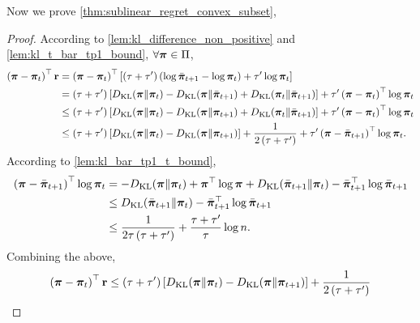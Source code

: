 Now we prove \cref{thm:sublinear_regret_convex_subset},
\begin{proof}
According to \cref{lem:kl_difference_non_positive} and \cref{lem:kl_t_bar_tp1_bound}, $\forall {\boldsymbol{\pi}} \in \Pi$,
\begin{equation*}
\begin{split}
    \left( {\boldsymbol{\pi}} - {\boldsymbol{\pi}}_t \right)^\top {\mathbf{r}} &= \left( {\boldsymbol{\pi}} - {\boldsymbol{\pi}}_t \right)^\top \left[ \left(\tau + \tau^\prime\right) \left( \log{\bar{{\boldsymbol{\pi}}}_{t+1}} - \log{{\boldsymbol{\pi}}_t} \right) + \tau^\prime \log{{\boldsymbol{\pi}}_t} \right] \\
    &= \left(\tau + \tau^\prime\right) \left[ D_{\mathrm{KL}}{\left( {\boldsymbol{\pi}} \middle\| {\boldsymbol{\pi}}_t \right)} - D_{\mathrm{KL}}{\left( {\boldsymbol{\pi}} \middle\| \bar{{\boldsymbol{\pi}}}_{t+1} \right)} + D_{\mathrm{KL}}{\left( {\boldsymbol{\pi}}_t \middle\| \bar{{\boldsymbol{\pi}}}_{t+1} \right)}  \right] + \tau^\prime \left( {\boldsymbol{\pi}} - {\boldsymbol{\pi}}_t \right)^\top \log{{\boldsymbol{\pi}}_t} \\
    &\le \left(\tau + \tau^\prime\right) \left[ D_{\mathrm{KL}}{\left( {\boldsymbol{\pi}} \middle\| {\boldsymbol{\pi}}_t \right)} - D_{\mathrm{KL}}{\left( {\boldsymbol{\pi}} \middle\| {\boldsymbol{\pi}}_{t+1} \right)} + D_{\mathrm{KL}}{\left( {\boldsymbol{\pi}}_t \middle\| \bar{{\boldsymbol{\pi}}}_{t+1} \right)}  \right] + \tau^\prime \left( {\boldsymbol{\pi}} - {\boldsymbol{\pi}}_t \right)^\top \log{{\boldsymbol{\pi}}_t} \\
    &\le \left(\tau + \tau^\prime\right) \left[ D_{\mathrm{KL}}{\left( {\boldsymbol{\pi}} \middle\| {\boldsymbol{\pi}}_t \right)} - D_{\mathrm{KL}}{\left( {\boldsymbol{\pi}} \middle\| {\boldsymbol{\pi}}_{t+1} \right)} \right] + \frac{1}{2\left(\tau + \tau^\prime\right)} + \tau^\prime \left( {\boldsymbol{\pi}} - \bar{{\boldsymbol{\pi}}}_{t+1} \right)^\top \log{{\boldsymbol{\pi}}_t}.
\end{split}
\end{equation*}
According to \cref{lem:kl_bar_tp1_t_bound},
\begin{equation*}
\begin{split}
    \left( {\boldsymbol{\pi}} - \bar{{\boldsymbol{\pi}}}_{t+1} \right)^\top \log{{\boldsymbol{\pi}}_t} &= - D_{\mathrm{KL}}{\left( {\boldsymbol{\pi}} \middle\| {\boldsymbol{\pi}}_t \right)} + {\boldsymbol{\pi}}^\top \log{{\boldsymbol{\pi}}} + D_{\mathrm{KL}}{\left( \bar{{\boldsymbol{\pi}}}_{t+1} \middle\| {\boldsymbol{\pi}}_t \right)} - \bar{{\boldsymbol{\pi}}}_{t+1}^\top \log{\bar{{\boldsymbol{\pi}}}_{t+1}} \\
    &\le D_{\mathrm{KL}}{\left( \bar{{\boldsymbol{\pi}}}_{t+1} \middle\| {\boldsymbol{\pi}}_t \right)} - \bar{{\boldsymbol{\pi}}}_{t+1}^\top \log{\bar{{\boldsymbol{\pi}}}_{t+1}} \\
    &\le \frac{1}{2\tau \left(\tau + \tau^\prime\right)} + \frac{\tau + \tau^\prime}{\tau} \log{n}.
\end{split}
\end{equation*}
Combining the above,
\begin{equation*}
\begin{split}
    \left( \rvpi - \rvpi_t \right)^\top \rvr &\le \left(\tau + \tau^\prime\right) \left[ \KL{\left( \rvpi \middle\| \rvpi_t \right)} - \KL{\left( \rvpi \middle\| \rvpi_{t+1} \right)} \right] + \frac{1}{2\left(\tau + \tau^\prime\right)} \\

\end{split}
\end{equation*}
\end{proof}
